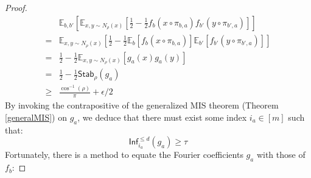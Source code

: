 \begin{proof}
\begin{align}
  & \mathbb{E}_{b,b'}\left[
  \mathbb{E}_{x,y\sim N_{\rho}(x)}\left[
  \frac{1}{2} - \frac{1}{2}f_b(x \circ \pi_{b,a})f_{b'}(y \circ \pi_{b',a})\right]\right] \\
  =  & \mathbb{E}_{x,y\sim N_{\rho}(x)}\left[
    \frac{1}{2} - \frac{1}{2}\mathbb{E}_{b}\left[f_b(x \circ \pi_{b,a})\right]\mathbb{E}_{b'}\left[f_{b'}(y \circ \pi_{b',a})\right]\right] \\
     = &  \frac{1}{2} - \frac{1}{2}\mathbb{E}_{x,y\sim N_{\rho}(x)}\left[g_a(x)g_a(y)\right]\\
     = & \frac{1}{2} - \frac{1}{2}\mathsf{Stab}_{\rho}(g_a) \\
   \geq & \frac{\cos^{-1}(\rho)}{\pi} + \epsilon/2
\end{align}
By invoking the contrapositive of the generalized MIS theorem (Theorem \ref{generalMIS}) on $g_a$, we deduce that there must exist some index $i_a \in [m]$ such that:
%
\begin{equation} \label{contra}
\mathsf{Inf}_{i_a}^{\leq d}(g_a) \geq \tau
\end{equation}
%
Fortunately, there is a method to equate the Fourier coefficients $g_a$ with those of $f_b$:


\end{proof}
